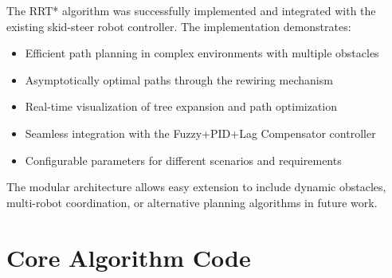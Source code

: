 \documentclass[12pt,a4paper]{scrartcl}
\begin{document}
	\justify
	The RRT* algorithm was successfully implemented and integrated with the existing skid-steer robot controller. The implementation demonstrates:
	
	\begin{itemize}
		\item Efficient path planning in complex environments with multiple obstacles
		\item Asymptotically optimal paths through the rewiring mechanism
		\item Real-time visualization of tree expansion and path optimization
		\item Seamless integration with the Fuzzy+PID+Lag Compensator controller
		\item Configurable parameters for different scenarios and requirements
	\end{itemize}
	
	The modular architecture allows easy extension to include dynamic obstacles, multi-robot coordination, or alternative planning algorithms in future work.
	
	\newpage
	\appendix
	\section{Core Algorithm Code}
	
\end{document}
